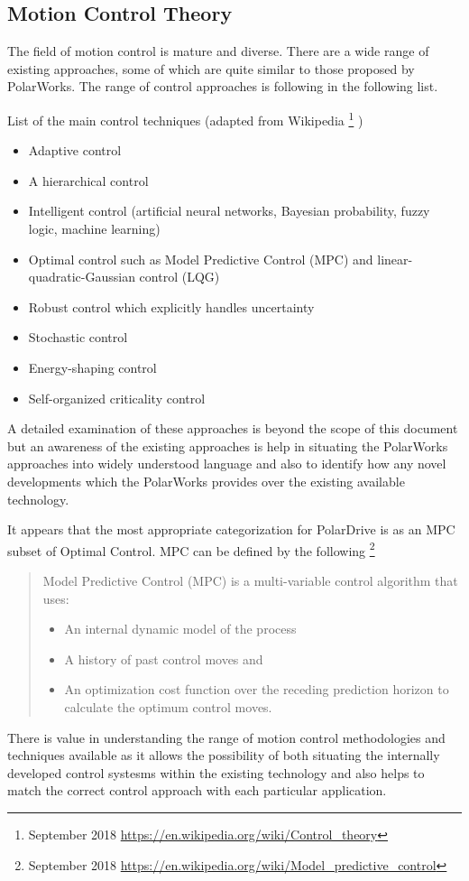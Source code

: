 \documentclass{article}
\begin{document}
\subsection{Motion Control Theory}
The field of motion control is mature and diverse. There are a wide range of existing approaches, some of which are quite similar to those proposed by PolarWorks. The range of control approaches is following in the following list. 
\par
List of the main control techniques (adapted from Wikipedia \footnote{September 2018 \url{https://en.wikipedia.org/wiki/Control_theory} } )
\begin{itemize}
\item Adaptive control 
\item A hierarchical control 
\item Intelligent control (artificial neural networks, Bayesian probability, fuzzy logic, machine learning) 
\item Optimal control such as Model Predictive Control (MPC) and linear-quadratic-Gaussian control (LQG) 
\item Robust control which explicitly handles uncertainty 
\item Stochastic control
\item Energy-shaping control 
\item Self-organized criticality control 
\end{itemize}
\par
A detailed examination of these approaches is beyond the scope of this document but an awareness of the existing approaches is help in situating the PolarWorks approaches into widely understood language and also to identify how any novel developments which the PolarWorks provides over the existing available technology. 
\par 
It appears that the most appropriate categorization for PolarDrive is as an MPC subset of Optimal Control. MPC can be defined by the following \footnote{September 2018 \url{https://en.wikipedia.org/wiki/Model_predictive_control}} 
\begin{quote}
Model Predictive Control (MPC) is a multi-variable control algorithm that uses:
\begin{itemize}
\item An internal dynamic model of the process
\item A history of past control moves and
\item An optimization cost function over the receding prediction horizon to calculate the optimum control moves.
\end{itemize}
\end{quote}
\par
There is value in understanding the range of motion control methodologies and techniques available as it allows the possibility of both situating the internally developed control systesms within the existing technology and also helps to match the correct control approach with each particular application.
\par
\end{document}
